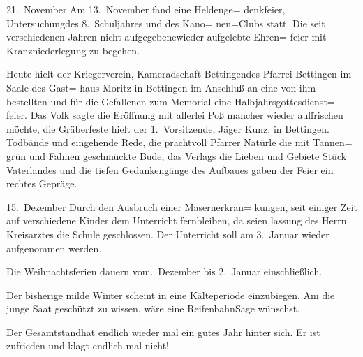 

21.\ November  Am 13.\ November fand eine Heldenge=\ob
denkfeier, Untersuchung\unsicher des 8.\ Schuljahres und des Kano=\ob
nen=Clubs statt. Die seit verschiedenen\ob
Jahren nicht aufgegebene\unsicher wieder aufgelebte Ehren=\ob
feier mit Kranzniederlegung zu begehen.

Heute hielt der Kriegerverein, Kameradschaft\ob
Bettingen\unsicher des Pfarrei Bettingen im Saale des Gast=\ob
haus Moritz in Bettingen im Anschluß an eine\ob
von ihm bestellten und für die Gefallenen\ob
zum Memorial eine Halbjahrsgottesdienst=\ob
feier\unsicher. Das Volk sagte die Eröffnung mit allerlei\ob
Poß mancher wieder auffrischen möchte, die\ob
Gräberfeste hielt der 1.\ Vorsitzende, Jäger Kunz,\ob
in Bettingen. Todbände und eingehende Rede,\ob
die prachtvoll Pfarrer Natürle die mit Tannen=\ob
grün und Fahnen geschmückte Bude, das Verlags\ob
die Lieben und Gebiete Stück Vaterlandes und\ob
die tiefen Gedankengänge des Aufbaues\ob
gaben der Feier ein rechtes Gepräge.

15.\ Dezember  Durch den Ausbruch einer Masernerkran=\ob
kungen, seit einiger Zeit auf verschiedene\ob
Kinder dem Unterricht fernbleiben, da seien%
lassung des Herrn Kreisarztes die Schule\ob
geschlossen. Der Unterricht soll am 3.\ Januar\ob
wieder aufgenommen werden.

Die Weihnachtsferien dauern vom.\ Dezember bis 2.\ Januar einschließlich.

Der bisherige milde Winter scheint\ob
in eine Kälteperiode einzubiegen. Am\ob
die junge Saat geschützt zu wissen, wäre\ob
eine Reifenbahn\unsicher Sage wünschst\unsicher.

Der Gesamtstand\unsicher hat endlich wieder\ob
mal ein gutes Jahr hinter sich. Er ist zufrieden\ob
und klagt endlich mal nicht!
\pend

